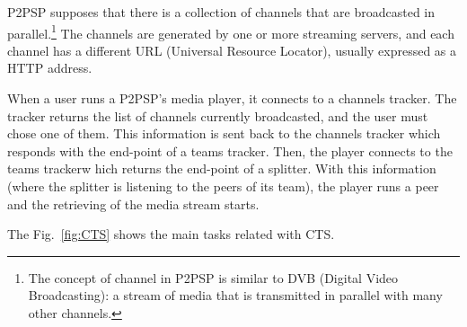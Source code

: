 \label{sec:CTS}
\begin{figure*}
   \caption{Tasks involved in channels
    tracking.\label{fig:CTS}}
\end{figure*}
P2PSP supposes that there is a collection of channels that are
broadcasted in parallel.\footnote{The concept of channel in P2PSP is
  similar to DVB (Digital Video Broadcasting): a stream of media that
  is transmitted in parallel with many other channels.} The channels
are generated by one or more streaming servers, and each channel has a
different URL (Universal Resource Locator), usually expressed as a
HTTP address.

When a user runs a P2PSP's media player, it connects to a channels
tracker. The tracker returns the list of channels currently
broadcasted, and the user must chose one of them. This information is
sent back to the channels tracker which responds with the end-point of
a teams tracker. Then, the player connects to the teams trackerw hich
returns the end-point of a splitter. With this information (where the
splitter is listening to the peers of its team), the player runs a
peer and the retrieving of the media stream starts.

The Fig.~\ref{fig:CTS} shows the main tasks related with CTS. 
